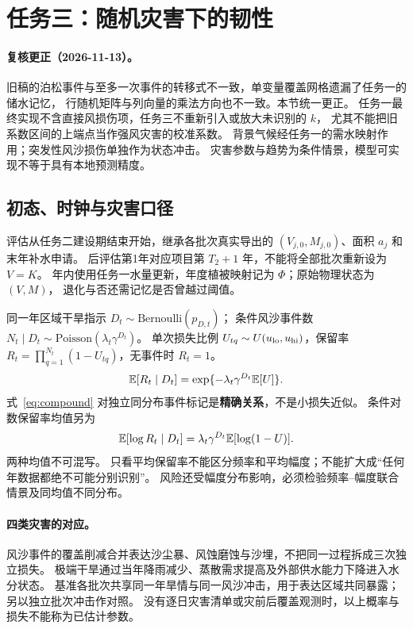 \section{任务三：随机灾害下的韧性}\label{sec:t3}

\paragraph{复核更正（2026-11-13）。}
旧稿的泊松事件与至多一次事件的转移式不一致，单变量覆盖网格遗漏了任务一的储水记忆，
行随机矩阵与列向量的乘法方向也不一致。本节统一更正。
任务一最终实现不含直接风损伤项，任务三不重新引入或放大未识别的 $k$，
尤其不能把旧系数区间的上端点当作强风灾害的校准系数。
背景气候经任务一的需水映射作用；突发性风沙损伤单独作为状态冲击。
灾害参数与趋势为条件情景，模型可实现不等于具有本地预测精度。

\subsection{初态、时钟与灾害口径}
评估从任务二建设期结束开始，继承各批次真实导出的 $(V_{j,0},M_{j,0})$、面积 $a_j$ 和末年补水申请。
后评估第1年对应项目第 $T_2+1$ 年，不能将全部批次重新设为 $V=K$。
年内使用任务一水量更新，年度植被映射记为 $\Phi$；原始物理状态为 $(V,M)$，
退化与否还需记忆是否曾越过阈值。

同一年区域干旱指示 $D_t\sim\mathrm{Bernoulli}(p_{D,t})$；
条件风沙事件数 $N_t\mid D_t\sim\mathrm{Poisson}(\lambda_t\gamma^{D_t})$。
单次损失比例 $U_{tq}\sim U(u_{\rm lo},u_{\rm hi})$，保留率
$R_t=\prod_{q=1}^{N_t}(1-U_{tq})$，无事件时 $R_t=1$。
\begin{equation}\label{eq:compound}
\mathbb{E}[R_t\mid D_t]=\exp\{-\lambda_t\gamma^{D_t}\mathbb{E}[U]\}.
\end{equation}
式~\eqref{eq:compound} 对独立同分布事件标记是\textbf{精确关系}，不是小损失近似。
条件对数保留率均值另为
\[\mathbb{E}[\log R_t\mid D_t]=\lambda_t\gamma^{D_t}\mathbb{E}[\log(1-U)].\]
两种均值不可混写。
只看平均保留率不能区分频率和平均幅度；不能扩大成“任何年数据都绝不可能分别识别”。
风险还受幅度分布影响，必须检验频率--幅度联合情景及同均值不同分布。

\paragraph{四类灾害的对应。}
风沙事件的覆盖削减合并表达沙尘暴、风蚀磨蚀与沙埋，不把同一过程拆成三次独立损失。
极端干旱通过当年降雨减少、蒸散需求提高及外部供水能力下降进入水分状态。
基准各批次共享同一年旱情与同一风沙冲击，用于表达区域共同暴露；另以独立批次冲击作对照。
没有逐日灾害清单或灾前后覆盖观测时，以上概率与损失不能称为已估计参数。

